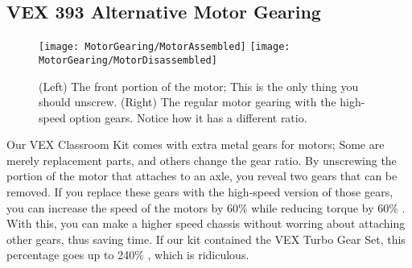 \subsection{VEX 393 Alternative Motor Gearing}

\begin{figure}[h]
    \centering
    \texttt{[image: MotorGearing/MotorAssembled]}
    \texttt{[image: MotorGearing/MotorDisassembled]}
    \caption{
        (Left) The front portion of the motor; This is the only thing you should unscrew. (Right) The regular motor gearing with the high-speed option gears. Notice how it has a different ratio.
    }
\end{figure}

Our VEX Classroom Kit comes with extra metal gears for motors; Some are merely replacement parts, and others change the gear ratio. By unscrewing the portion of the motor that attaches to an axle, you reveal two gears that can be removed. If you replace these gears with the high-speed version of those gears, you can increase the speed of the motors by 60\% while reducing torque by 60\% \cite{VEXMotor}. With this, you can make a higher speed chassis without worring about attaching other gears, thus saving time. If our kit contained the VEX Turbo Gear Set, this percentage goes up to 240\% \cite{VEXMotor}, which is ridiculous.
